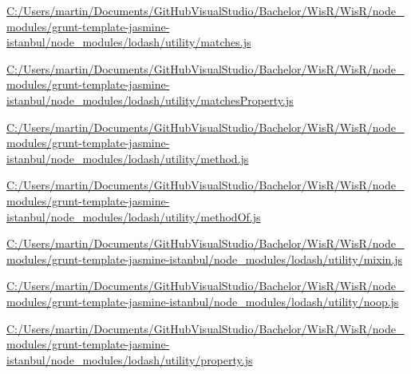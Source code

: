 \begin{DoxyCompactItemize}
\item 
\hyperlink{_c_1_2_users_2martin_2_documents_2_git_hub_visual_studio_2_bachelor_2_wis_r_2_wis_r_2node_module5acb76ccb46917548412ebcb6b59d4bd}{C\+:/\+Users/martin/\+Documents/\+Git\+Hub\+Visual\+Studio/\+Bachelor/\+Wis\+R/\+Wis\+R/node\+\_\+modules/grunt-\/template-\/jasmine-\/istanbul/node\+\_\+modules/lodash/utility/matches.\+js}
\item 
\hyperlink{_c_1_2_users_2martin_2_documents_2_git_hub_visual_studio_2_bachelor_2_wis_r_2_wis_r_2node_modulef3e87de63b5abc0fd055341966021c40}{C\+:/\+Users/martin/\+Documents/\+Git\+Hub\+Visual\+Studio/\+Bachelor/\+Wis\+R/\+Wis\+R/node\+\_\+modules/grunt-\/template-\/jasmine-\/istanbul/node\+\_\+modules/lodash/utility/matches\+Property.\+js}
\item 
\hyperlink{_c_1_2_users_2martin_2_documents_2_git_hub_visual_studio_2_bachelor_2_wis_r_2_wis_r_2node_modulecbe8edcd551e753408d52d618c728f25}{C\+:/\+Users/martin/\+Documents/\+Git\+Hub\+Visual\+Studio/\+Bachelor/\+Wis\+R/\+Wis\+R/node\+\_\+modules/grunt-\/template-\/jasmine-\/istanbul/node\+\_\+modules/lodash/utility/method.\+js}
\item 
\hyperlink{_c_1_2_users_2martin_2_documents_2_git_hub_visual_studio_2_bachelor_2_wis_r_2_wis_r_2node_module4605af2c45ab3e08195d9ab1e38a0883}{C\+:/\+Users/martin/\+Documents/\+Git\+Hub\+Visual\+Studio/\+Bachelor/\+Wis\+R/\+Wis\+R/node\+\_\+modules/grunt-\/template-\/jasmine-\/istanbul/node\+\_\+modules/lodash/utility/method\+Of.\+js}
\item 
\hyperlink{_c_1_2_users_2martin_2_documents_2_git_hub_visual_studio_2_bachelor_2_wis_r_2_wis_r_2node_module2f3854f633c4a479bab6819e85c5b435}{C\+:/\+Users/martin/\+Documents/\+Git\+Hub\+Visual\+Studio/\+Bachelor/\+Wis\+R/\+Wis\+R/node\+\_\+modules/grunt-\/template-\/jasmine-\/istanbul/node\+\_\+modules/lodash/utility/mixin.\+js}
\item 
\hyperlink{_c_1_2_users_2martin_2_documents_2_git_hub_visual_studio_2_bachelor_2_wis_r_2_wis_r_2node_module7b36e39da936e656ea1eb07f617b1dff}{C\+:/\+Users/martin/\+Documents/\+Git\+Hub\+Visual\+Studio/\+Bachelor/\+Wis\+R/\+Wis\+R/node\+\_\+modules/grunt-\/template-\/jasmine-\/istanbul/node\+\_\+modules/lodash/utility/noop.\+js}
\item 
\hyperlink{_c_1_2_users_2martin_2_documents_2_git_hub_visual_studio_2_bachelor_2_wis_r_2_wis_r_2node_module533d8c06b04613235215a1a48d3ce693}{C\+:/\+Users/martin/\+Documents/\+Git\+Hub\+Visual\+Studio/\+Bachelor/\+Wis\+R/\+Wis\+R/node\+\_\+modules/grunt-\/template-\/jasmine-\/istanbul/node\+\_\+modules/lodash/utility/property.\+js}

\end{DoxyCompactItemize}
